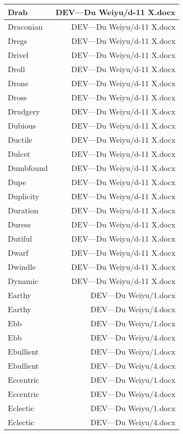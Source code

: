 \documentclass{article}
\begin{document}
\begin{center}
\begin{longtable}{|l|r|}
\hline
Drab  &  DEV---Du Weiyu/d-11 X.docx\\  
\hline
Draconian  &  DEV---Du Weiyu/d-11 X.docx\\  
\hline
Dregs  &  DEV---Du Weiyu/d-11 X.docx\\  
\hline
Drivel  &  DEV---Du Weiyu/d-11 X.docx\\  
\hline
Droll  &  DEV---Du Weiyu/d-11 X.docx\\  
\hline
Drone  &  DEV---Du Weiyu/d-11 X.docx\\  
\hline
Dross  &  DEV---Du Weiyu/d-11 X.docx\\  
\hline
Drudgery  &  DEV---Du Weiyu/d-11 X.docx\\  
\hline
Dubious  &  DEV---Du Weiyu/d-11 X.docx\\  
\hline
Ductile  &  DEV---Du Weiyu/d-11 X.docx\\  
\hline
Dulcet  &  DEV---Du Weiyu/d-11 X.docx\\  
\hline
Dumbfound  &  DEV---Du Weiyu/d-11 X.docx\\  
\hline
Dupe  &  DEV---Du Weiyu/d-11 X.docx\\  
\hline
Duplicity  &  DEV---Du Weiyu/d-11 X.docx\\  
\hline
Duration  &  DEV---Du Weiyu/d-11 X.docx\\  
\hline
Duress  &  DEV---Du Weiyu/d-11 X.docx\\  
\hline
Dutiful  &  DEV---Du Weiyu/d-11 X.docx\\  
\hline
Dwarf  &  DEV---Du Weiyu/d-11 X.docx\\  
\hline
Dwindle  &  DEV---Du Weiyu/d-11 X.docx\\  
\hline
Dynamic  &  DEV---Du Weiyu/d-11 X.docx\\  
\hline
Earthy  &  DEV---Du Weiyu/1.docx\\  
\hline
Earthy  &  DEV---Du Weiyu/4.docx\\  
\hline
Ebb  &  DEV---Du Weiyu/1.docx\\  
\hline
Ebb  &  DEV---Du Weiyu/4.docx\\  
\hline
Ebullient  &  DEV---Du Weiyu/1.docx\\  
\hline
Ebullient  &  DEV---Du Weiyu/4.docx\\  
\hline
Eccentric  &  DEV---Du Weiyu/1.docx\\  
\hline
Eccentric  &  DEV---Du Weiyu/4.docx\\  
\hline
Eclectic  &  DEV---Du Weiyu/1.docx\\  
\hline
Eclectic  &  DEV---Du Weiyu/4.docx\\  

\end{longtable}
\end{center}
\end{document}
